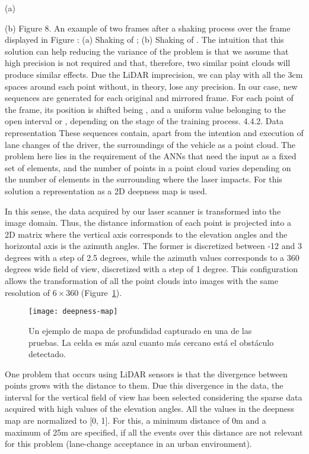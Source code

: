 (a)

(b)
Figure 8. An example of two frames after a shaking process over the frame displayed in Figure : (a) Shaking of ; (b) Shaking of .
The intuition that this solution can help reducing the variance of the problem is that we assume that high precision is not required and that, therefore, two similar point clouds will produce similar effects. Due the LiDAR imprecision, we can play with all the 3cm spaces around each point without, in theory, lose any precision.
In our case, new sequences are generated for each original and mirrored frame. For each point of the frame, its position is shifted  being ,  and  a uniform value belonging to the open interval  or , depending on the stage of the training process.
4.4.2. Data representation
These sequences contain, apart from the intention and execution of lane changes of the driver, the surroundings of the vehicle as a point cloud. The problem here lies in the requirement of the ANNs that need the input as a fixed set of elements, and the number of points in a point cloud varies depending on the number of elements in the surrounding where the laser impacts. For this solution a representation as a 2D deepness map is used.

In this sense, the data acquired by our laser scanner is transformed into the image domain. Thus, the distance information of each point is projected into a 2D matrix where the vertical axis corresponds to the elevation angles and the horizontal axis is the azimuth angles. The former is discretized between -12 and 3 degrees with a step of 2.5 degrees, while the azimuth values corresponds to a 360 degrees wide field of view, discretized with a step of 1 degree. This configuration allows the transformation of all the point clouds into images with the same resolution of $6 \times 360$ (Figure~\ref{fig:deepness-map}).

\begin{figure}
	\texttt{[image: deepness-map]}
	\caption{Un ejemplo de mapa de profundidad capturado en una de las pruebas. La celda es más azul cuanto más cercano está el obstáculo detectado.}
	\label{fig:deepness-map}
\end{figure}

One problem that occurs using LiDAR sensors is that the divergence between points grows with the distance to them. Due this divergence in the data, the interval for the vertical field of view has been selected considering the sparse data acquired with high values of the elevation angles.
All the values in the deepness map are normalized to [0, 1]. For this, a minimum distance of 0m and a maximum of 25m are specified, if all the events over this distance are not relevant for this problem (lane-change acceptance in an urban environment).